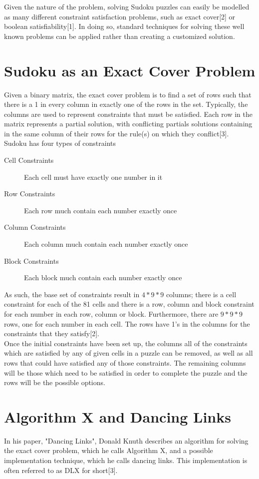 \documentclass[12pt]{article}
\newcounter{row}
\newcounter{col}
\begin{document}
Given the nature of the problem, solving Sudoku puzzles can easily be modelled as many different constraint satisfaction problems, such as exact cover[2] or boolean satisfiability[1]. In doing so, standard techniques for solving these well known problems can be applied rather than creating a customized solution.  \\

\section{Sudoku as an Exact Cover Problem}
Given a binary matrix, the exact cover problem is to find a set of rows such that there is a 1 in every column in exactly one of the rows in the set. Typically, the columns are used to represent constraints that must be satisfied. Each row in the matrix represents a partial solution, with conflicting partials solutions containing in the same column of their rows for the rule(s) on which they conflict[3]. \\

Sudoku has four types of constraints
\begin{description}
\item[Cell Constraints] Each cell must have exactly one number in it
\item[Row Constraints] Each row much contain each number exactly once
\item[Column Constraints] Each column much contain each number exactly once
\item[Block Constraints] Each block much contain each number exactly once
\end{description}
As such, the base set of constraints result in $4*9*9$ columns; there is a cell constraint for each of the 81 cells and there is a row, column and block constraint for each number in each row, column or block. Furthermore, there are $9*9*9$ rows, one for each number in each cell. The rows have 1's in the columns for the constraints that they satisfy[2]. \\

Once the initial constraints have been set up, the columns all of the constraints which are satisfied by any of given cells in a puzzle can be removed, as well as all rows that could have satisfied any of those constraints. The remaining columns will be those which need to be satisfied in order to complete the puzzle and the rows will be the possible options.
\section{Algorithm X and Dancing Links}
In his paper, "Dancing Links", Donald Knuth describes an algorithm for solving the exact cover problem, which he calls Algorithm X, and a possible implementation technique, which he calls dancing links. This implementation is often referred to as DLX for short[3]. \\
\end{document}
